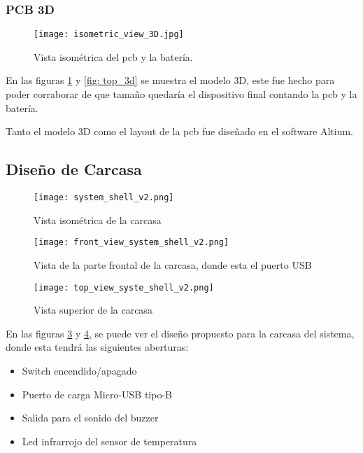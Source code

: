 \subsubsection{PCB 3D}
\begin{figure}[htp!]
    \centering
    \texttt{[image: isometric\_view\_3D.jpg]}
    \caption{Vista isométrica del \acrshort{pcb} y la batería.}
    \label{fig: isometric_3d}
\end{figure}
\FloatBarrier

En las figuras \ref{fig: isometric_3d} y \ref{fig: top_3d} se muestra el modelo 3D, este fue hecho
para poder corraborar de que tamaño quedaría el dispositivo final contando la \acrshort{pcb} y la batería.

Tanto el modelo 3D como el layout de la \acrshort{pcb} fue diseñado en el software Altium.
\subsection{Diseño de Carcasa}
\begin{figure}[htp!]
    \centering
    \texttt{[image: system\_shell\_v2.png]}
    \caption{Vista isométrica de la carcasa}
    \label{fig: isometric_view_shell}
\end{figure}
\FloatBarrier

\begin{figure}[htp!]
    \centering
    \texttt{[image: front\_view\_system\_shell\_v2.png]}
    \caption{Vista de la parte frontal de la carcasa, donde esta el puerto USB}
    \label{fig: front_view_shell}
\end{figure}
\FloatBarrier

\begin{figure}[htp!]
    \centering
    \texttt{[image: top\_view\_syste\_shell\_v2.png]}
    \caption{Vista superior de la carcasa}
    \label{fig: top_view_shell}
\end{figure}
\FloatBarrier


En las figuras \ref{fig: front_view_shell} y \ref{fig: top_view_shell}, 
se puede ver el diseño propuesto para la carcasa del sistema, donde esta 
tendrá las siguientes aberturas:

\begin{itemize}
    \item Switch encendido/apagado
    \item Puerto de carga Micro-USB tipo-B
    \item Salida para el sonido del buzzer
    \item Led infrarrojo del sensor de temperatura
\end{itemize}

